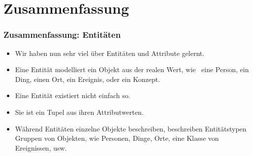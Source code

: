 \documentclass[aspectratio=169,mathserif,notheorems]{beamer}%
\begin{document}
\section{Zusammenfassung}%
%
\begin{frame}%
\frametitle{Zusammenfassung: Entitäten}%
\begin{itemize}%
\item Wir haben nun sehr viel über Entitäten und Attribute gelernt.%
%
\item<2-> Eine Entität modelliert ein Objekt aus der realen Wert, wie \DEzB\ eine Person, ein Ding, einen Ort, ein Ereignis, oder ein Konzept.%
%
\item<3-> Eine Entität existiert nicht einfach so.%
%
\item<4-> Sie ist ein Tupel aus ihren Attributwerten.%
%
\item<5-> Während Entitäten einzelne Objekte beschreiben, beschreiben Entitätstypen Gruppen von Objekten, wie Personen, Dinge, Orte, eine Klasse von Ereignissen, usw.%
\end{itemize}%
\end{frame}%
%
\end{document}

